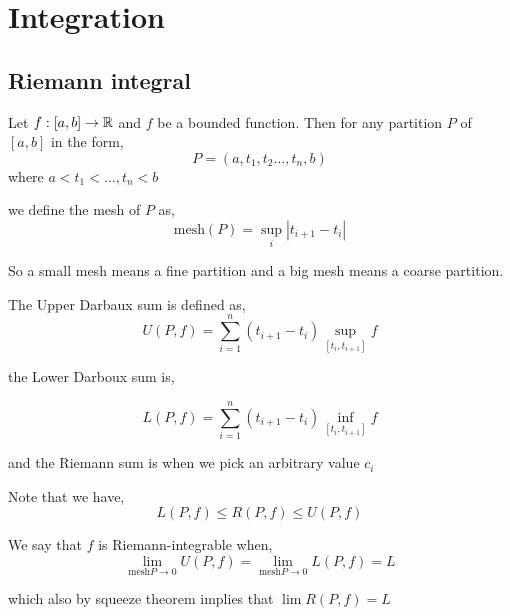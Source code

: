 \chapter{Integration}

\section{Riemann integral}

Let $f: [a, b] \to \mathbb{R}$  and $f$ be a bounded function. Then for any partition $P$  of $[a, b]$ in the form, 
\[
    P =(a, t_{1}, t_{2} \dots, t_n, b)
\]
where $a < t_{1} < \dots, t_n < b$

we define the mesh of $P$ as, 
\[
    \text{mesh}(P) = \sup_i |t_{i + 1} -t_i|
\]
\begin{remark}
    So a small mesh means a fine partition and a big mesh means a coarse partition.
\end{remark}


\begin{definition}
    The Upper Darbaux sum is defined as, 
    \[
        U(P, f) = \sum_{i = 1}^{n}   (t_{i + 1} - t_i) \sup_{[t_i, t_{i + 1}]} f
    \]

    the Lower Darboux sum is, 
    
    \[
        L(P, f) = \sum_{i = 1}^{n}   (t_{i + 1} - t_i) \inf_{[t_i, t_{i + 1}]} f
    \]

    and the Riemann sum is when we pick an arbitrary value $c_i$
\end{definition}
\begin{note}
    Note that we have, 
    \[
        L(P, f) \le R(P, f) \le U(P, f)
    \]
\end{note}


We say that $f$ is Riemann-integrable when, 
\[
    \lim_{\text{mesh} P \to 0} U(P ,f) = \lim_{\text{mesh} P \to 0} L(P, f) = L
\]

which also by squeeze theorem implies that $\lim R(P, f) = L$

